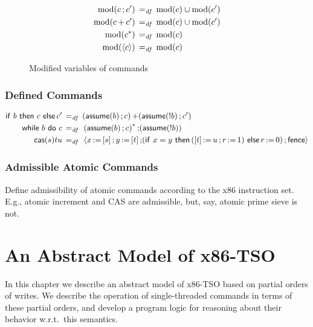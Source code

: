 \documentclass[11pt]{report}
\begin{document}
\begin{figure}[h]
	\centering
	\begin{align*}
		\mod{\cseq{c}{c'}} \eqdef {} & \mod{c} \cup \mod{c'} \\ 
		\mod{\cchoice{c}{c'}} \eqdef {} & \mod{c} \cup \mod{c'} \\ 
		\mod{\cloop{c}} \eqdef {} & \mod{c} \\ 
		\mod{\catomic{c}} \eqdef {} & \mod{c} 
 	\end{align*}
	\caption{Modified variables of commands}
	\label{fig:modcomm}
\end{figure}

\subsection{Defined Commands} %
\label{sub:defined_commands}

\begin{align*}
	\cifthenelse{b}{c}{c'} \eqdef {} & \cchoice{(\cseq{\cassume{b}}{c})}{(\cseq{\cassume{!b}}{c'})} \\
	\cwhile{b}{c} \eqdef {} & \cseq{\cloop{\left(\cseq{\cassume{b}}{c}\right)}}{(\cassume{!b})} \\
	\ccas{s}{t}{u} \eqdef {} & \catomic{\cseq{\cseq{\cseq{\cload{x}{s}}{\cload{y}{t}}}{(\cifthenelse{x = y}{(\cseq{\cstore{t}{u}}{\cassign{r}{1}})}{\cassign{r}{0}}})}{\cfence}}
\end{align*}

\subsection{Admissible Atomic Commands} %
\label{sub:admissible_atomic_commands}

Define admissibility of atomic commands according to the x86 instruction set. E.g., atomic increment and CAS are admissible, but, say, atomic prime sieve is not. 



\chapter{An Abstract Model of x86-TSO}

In this chapter we describe an abstract model of x86-TSO based on partial orders of writes. We describe the operation of single-threaded commands in terms of these partial orders, and develop a program logic for reasoning about their behavior w.r.t.~this semantics. 
\end{document}

